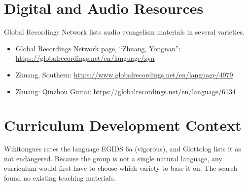 \documentclass[12pt]{article}
\begin{document}
\section{Digital and Audio Resources}
Global Recordings Network lists audio evangelism materials in several varieties.
\begin{itemize}
\item Global Recordings Network page, ``Zhuang, Yongnan'': \url{https://globalrecordings.net/en/language/zyn}
\item Zhuang, Southern: \url{https://www.globalrecordings.net/en/language/4979}
\item Zhuang: Qinzhou Guitai: \url{https://globalrecordings.net/en/language/6134}
\end{itemize}

\section{Curriculum Development Context}
Wikitongues rates the language EGIDS 6a (vigorous), and Glottolog lists it as not endangered. Because the group is not a single natural language, any curriculum would first have to choose which variety to base it on. The search found no existing teaching materials.
\end{document}
